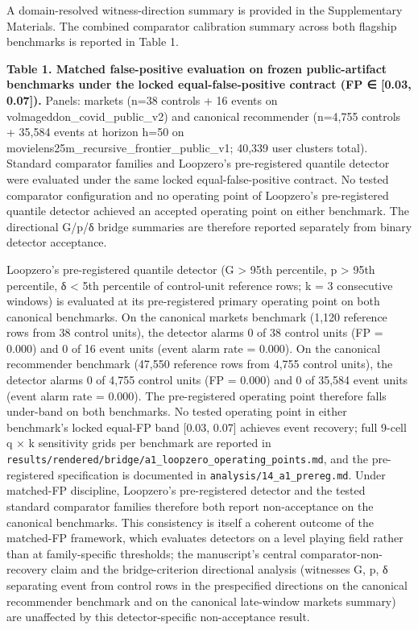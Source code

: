 \documentclass[
  11pt,
]{article}
\begin{document}
A domain-resolved witness-direction summary is provided in the
Supplementary Materials. The combined comparator calibration summary
across both flagship benchmarks is reported in Table 1.

\textbf{Table 1. Matched false-positive evaluation on frozen
public-artifact benchmarks under the locked equal-false-positive
contract (FP ∈ {[}0.03, 0.07{]}).} Panels: markets (n=38 controls + 16
events on volmageddon\_covid\_public\_v2) and canonical recommender
(n=4,755 controls + 35,584 events at horizon h=50 on
movielens25m\_recursive\_frontier\_public\_v1; 40,339 user clusters
total). Standard comparator families and Loopzero's pre-registered
quantile detector were evaluated under the same locked
equal-false-positive contract. No tested comparator configuration and no
operating point of Loopzero's pre-registered quantile detector achieved
an accepted operating point on either benchmark. The directional G/p/δ
bridge summaries are therefore reported separately from binary detector
acceptance.

Loopzero's pre-registered quantile detector (G \textgreater{} 95th
percentile, p \textgreater{} 95th percentile, δ \textless{} 5th
percentile of control-unit reference rows; k = 3 consecutive windows) is
evaluated at its pre-registered primary operating point on both
canonical benchmarks. On the canonical markets benchmark (1,120
reference rows from 38 control units), the detector alarms 0 of 38
control units (FP = 0.000) and 0 of 16 event units (event alarm rate =
0.000). On the canonical recommender benchmark (47,550 reference rows
from 4,755 control units), the detector alarms 0 of 4,755 control units
(FP = 0.000) and 0 of 35,584 event units (event alarm rate = 0.000). The
pre-registered operating point therefore falls under-band on both
benchmarks. No tested operating point in either benchmark's locked
equal-FP band {[}0.03, 0.07{]} achieves event recovery; full 9-cell q ×
k sensitivity grids per benchmark are reported in
\texttt{results/rendered/bridge/a1\_loopzero\_operating\_points.md}, and
the pre-registered specification is documented in
\texttt{analysis/14\_a1\_prereg.md}. Under matched-FP discipline,
Loopzero's pre-registered detector and the tested standard comparator
families therefore both report non-acceptance on the canonical
benchmarks. This consistency is itself a coherent outcome of the
matched-FP framework, which evaluates detectors on a level playing field
rather than at family-specific thresholds; the manuscript's central
comparator-non-recovery claim and the bridge-criterion directional
analysis (witnesses G, p, δ separating event from control rows in the
prespecified directions on the canonical recommender benchmark and on
the canonical late-window markets summary) are unaffected by this
detector-specific non-acceptance result.
\end{document}
